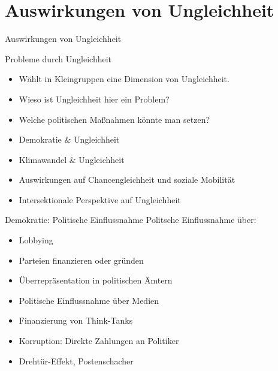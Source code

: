 \documentclass[aspectratio=169,xcolor=dvipsnames]{beamer}
\begin{document}
\section{Auswirkungen von Ungleichheit}

\begin{frame}[plain,c]
    \begin{center}
    \color{DarkBlue}
        Auswirkungen von Ungleichheit
    \end{center}
\end{frame}


\begin{frame}{Probleme durch Ungleichheit}
    \begin{itemize}
        \item Wählt in Kleingruppen eine Dimension von Ungleichheit.
        \item Wieso ist Ungleichheit hier ein Problem?
        \item Welche politischen Maßnahmen könnte man setzen?
    \end{itemize}

    \vspace{0.5cm}
    \pause
    \begin{itemize}
        \item Demokratie \& Ungleichheit
        \item Klimawandel \& Ungleichheit
        \item Auswirkungen auf Chancengleichheit und soziale Mobilität
        \item Intersektionale Perspektive auf Ungleichheit
    \end{itemize}
\end{frame}

\begin{frame}[label = demokratie_einflussnahme]{Demokratie: Politische Einflussnahme}
    Politsche Einflussnahme über:
        \begin{itemize}
            \item Lobbying \hyperlink{lobbying}{}
            \item Parteien finanzieren oder gründen \hyperlink{parteispenden}{}
            \item Überrepräsentation in politischen Ämtern \hyperlink{ueberrepraesentation}{}
            \item Politische Einflussnahme über Medien \hyperlink{medien}{}
            \item Finanzierung von Think-Tanks
            \item Korruption: Direkte Zahlungen an Politiker
            \item Drehtür-Effekt, Postenschacher
        \end{itemize}

    \hyperlink{meme-korruption}{}
\end{frame}
\end{document}
